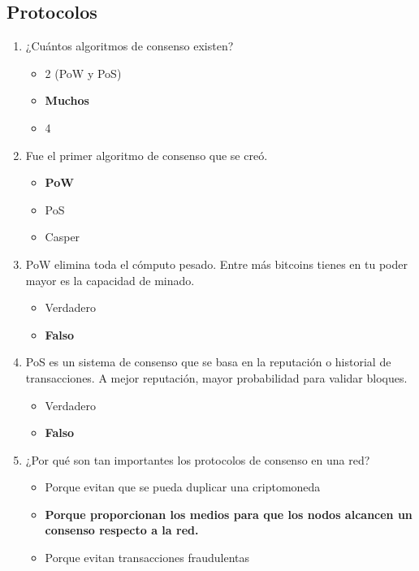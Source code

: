 \documentclass[a4paper,12pt]{lib/pub}
\begin{document}
\subsection{Protocolos}
\begin{enumerate}
	\item ¿Cuántos algoritmos de consenso existen?
	\begin{itemize}
		\item 2 (PoW y PoS)
		\item \textbf{Muchos}
		\item 4
	\end{itemize}
	\item Fue el primer algoritmo de consenso que se creó.
	\begin{itemize}
		\item \textbf{PoW}
		\item PoS
		\item Casper
	\end{itemize}
	\item PoW elimina toda el cómputo pesado. Entre más bitcoins tienes en tu poder mayor es la capacidad de minado.
	\begin{itemize}
		\item Verdadero
		\item \textbf{Falso}
	\end{itemize}
	\item PoS es un sistema de consenso que se basa en la reputación o historial de transacciones. A mejor reputación, mayor probabilidad para validar bloques.
	\begin{itemize}
		\item Verdadero
		\item \textbf{Falso}
	\end{itemize}
	\item ¿Por qué son tan importantes los protocolos de consenso en una red?
	\begin{itemize}
		\item Porque evitan que se pueda duplicar una criptomoneda
		\item \textbf{Porque proporcionan los medios para que los nodos alcancen un consenso respecto a la red.}
		\item Porque evitan transacciones fraudulentas
	\end{itemize}
\end{enumerate}
\end{document}
